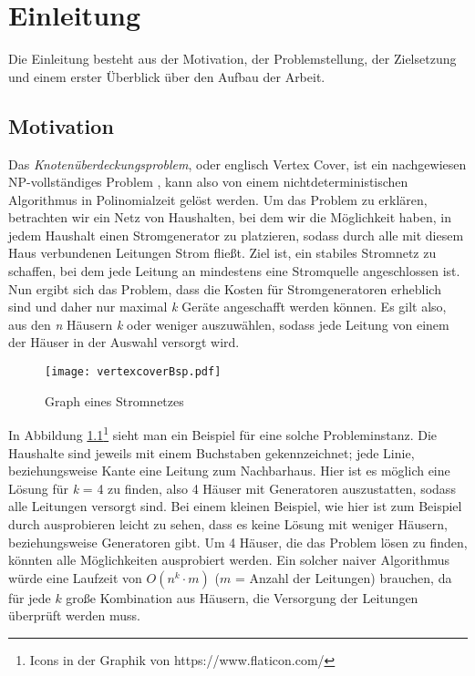 
\chapter{Einleitung}
\label{ch:Einleitung}
Die Einleitung besteht aus der Motivation, der Problemstellung, der Zielsetzung und einem erster Überblick über den Aufbau der Arbeit.

\section{Motivation}
\label{ch:Einleitung:sec:Motivation}
Das \emph{Knotenüberdeckungsproblem}, oder englisch Vertex Cover, ist ein nachgewiesen NP-vollständiges Problem \cite{intract}, kann also von einem nichtdeterministischen Algorithmus in Polinomialzeit gelöst werden. Um das Problem zu erklären, betrachten wir ein Netz von Haushalten, bei dem wir die Möglichkeit haben, in jedem Haushalt einen Stromgenerator zu platzieren, sodass durch alle mit diesem Haus verbundenen Leitungen Strom fließt. Ziel ist, ein stabiles Stromnetz zu schaffen, bei dem jede Leitung an mindestens eine Stromquelle angeschlossen ist. Nun ergibt sich das Problem, dass die Kosten für Stromgeneratoren erheblich sind und daher nur maximal \emph{k} Geräte angeschafft werden können. Es gilt also, aus den \emph{n} Häusern \emph{k} oder weniger auszuwählen, sodass jede Leitung von einem der Häuser in der Auswahl versorgt wird.
\begin{figure}[htb]
\centering
  	{\texttt{[image: vertexcoverBsp.pdf]}}
	\caption{Graph eines Stromnetzes \label{fig:vc}}
\centering
\end{figure}
In Abbildung \ref{fig:vc}\footnote{Icons in der Graphik von https://www.flaticon.com/}   sieht man ein Beispiel für eine solche Probleminstanz. Die Haushalte sind jeweils mit einem Buchstaben gekennzeichnet; jede Linie, beziehungsweise Kante eine Leitung zum Nachbarhaus. Hier ist es möglich eine Lösung für \emph{k} = 4 zu finden, also 4 Häuser mit Generatoren auszustatten, sodass alle Leitungen versorgt sind. Bei einem kleinen Beispiel, wie hier ist zum Beispiel durch ausprobieren leicht zu sehen, dass es keine Lösung mit weniger Häusern, beziehungsweise Generatoren gibt. Um 4 Häuser, die das Problem lösen zu finden, könnten alle Möglichkeiten ausprobiert werden. Ein solcher naiver Algorithmus würde eine Laufzeit von $O(n^{k} \cdot m)$ ($m$ = Anzahl der Leitungen) brauchen, da für jede $k$ große Kombination aus Häusern, die Versorgung der Leitungen überprüft werden muss.\\
